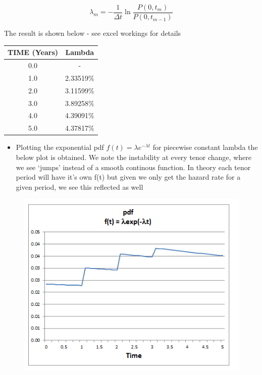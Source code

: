 \documentclass{article}
\providecommand{\tightlist}{%
      \setlength{\itemsep}{0pt}\setlength{\parskip}{0pt}}
\begin{document}
\[
\lambda_m = - \frac{1}{\Delta t} \ln \frac{P(0, t_m)}{P(0, t_{m-1})}
\]

The result is shown below - see excel workings for details

    \begin{longtable}[c]{@{}cc@{}}
\toprule
TIME (Years) & Lambda\tabularnewline
\midrule
\endhead
0.0 & -\tabularnewline
1.0 & 2.33519\%\tabularnewline
2.0 & 3.11599\%\tabularnewline
3.0 & 3.89258\%\tabularnewline
4.0 & 4.39091\%\tabularnewline
5.0 & 4.37817\%\tabularnewline
\bottomrule
\end{longtable}

    \begin{figure}[!htbp]
\centering
\caption{}
\end{figure}

\newpage

    \begin{itemize}
\tightlist
\item
  Plotting the exponential pdf \(f(t) = \lambda e^{-\lambda t}\) for
  piecewise constant lambda the below plot is obtained. We note the
  instability at every tenor change, where we see `jumps' instead of a
  smooth continous function. In theory each tenor period will have it's
  own f(t) but given we only get the hazard rate for a given period, we
  see this reflected as well
\end{itemize}

    \begin{figure}[htbp]
\centering
\includegraphics{../figs/pdf.PNG}
\caption{}
\end{figure}


    
    
    
    
\end{document}

